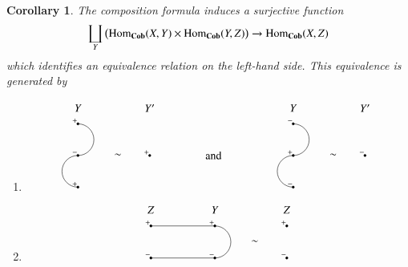 \documentclass{amsart}
\def\tn{\textnormal}
\def\Hom{\tn{Hom}}
\def\to{\rightarrow}
\def\Cob{{\bf Cob}}
\newtheorem{corollary}[subsection]{Corollary}
\theoremstyle{remark}
\theoremstyle{definition}
\begin{document}
\begin{corollary}

The composition formula induces a surjective function
$$\coprod_Y \big(\Hom_\Cob(X,Y)\times\Hom_\Cob(Y,Z)\big)\to\Hom_\Cob(X,Z)$$
which identifies an equivalence relation on the left-hand side. This equivalence is generated by
\begin{enumerate}
\item[(E1).]
\begin{equation*}
 \begin{tikzpicture}
  \node at (-4.25,1.5) {$Y$};
  \draw[fill=black] (-4.25,1) circle (1pt);
  \node at (-4.35,1.1) {$\scriptstyle+$};
  \draw[fill=black] (-4.25,0) circle (1pt);
  \node at (-4.35,0.1) {$\scriptstyle-$};
  \draw[fill=black] (-4.25,-1) circle (1pt);
  \node at (-4.35,-0.9) {$\scriptstyle+$};
  \draw (-4.25,1) arc (90:-90:0.5);
  \draw (-4.25,0) arc (90:270:0.5);
  \node at (-3,0) {$\sim$};
  \node at (-2,1.5) {$Y'$};
  \draw[fill=black] (-2,0) circle (1pt);
  \node at (-2.1,0.1) {$\scriptstyle+$};
  \node at (0,0) {and};
  \node at (2.5,1.5) {$Y$};
  \draw[fill=black] (2.5,1) circle (1pt);
  \node at (2.4,1.1) {$\scriptstyle-$};
  \draw[fill=black] (2.5,0) circle (1pt);
  \node at (2.4,0.1) {$\scriptstyle+$};
  \draw[fill=black] (2.5,-1) circle (1pt);
  \node at (2.4,-0.9) {$\scriptstyle-$};
  \draw (2.5,1) arc (90:-90:0.5);
  \draw (2.5,0) arc (90:270:0.5);
  \node at (3.75,0) {$\sim$};
  \node at (4.75,1.5) {$Y'$};
  \draw[fill=black] (4.75,0) circle (1pt);
  \node at (4.65,0.1) {$\scriptstyle-$};
 \end{tikzpicture}
\end{equation*}
\item[(E2).] 
\begin{equation*}
 \begin{tikzpicture}
  \node at (-3.25,1) {$Z$};
  \draw[fill=black] (-3.25,0.5) circle (1pt);
  \node at (-3.35,0.6) {$\scriptstyle+$};
  \draw[fill=black] (-3.25,-0.5) circle (1pt);
  \node at (-3.35,-0.4) {$\scriptstyle-$};
  \node at (-1.25,1) {$Y$};
  \draw[fill=black] (-1.25,0.5) circle (1pt);
  \node at (-1.35,0.6) {$\scriptstyle+$};
  \draw[fill=black] (-1.25,-0.5) circle (1pt);
  \node at (-1.35,-0.4) {$\scriptstyle-$};
  \draw (-1.25,0.5) arc (90:-90:0.5);
  \draw (-3.25,0.5) -- (-1.25,0.5);
  \draw (-3.25,-0.5) -- (-1.25,-0.5);
  \node at (0,0) {$\sim$};
  \node at (1,1) {$Z$};
  \draw[fill=black] (1,0.5) circle (1pt);
  \node at (0.9,0.6) {$\scriptstyle+$};
  \draw[fill=black] (1,-0.5) circle (1pt);
  \node at (0.9,-0.4) {$\scriptstyle-$};

\end{tikzpicture}
\end{equation*}
\end{enumerate}
\end{corollary}
\end{document}
